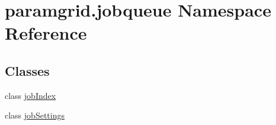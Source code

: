 \hypertarget{namespaceparamgrid_1_1jobqueue}{}\section{paramgrid.\+jobqueue Namespace Reference}
\label{namespaceparamgrid_1_1jobqueue}
\subsection*{Classes}
\begin{DoxyCompactItemize}
\item 
class \mbox{\hyperlink{classparamgrid_1_1jobqueue_1_1jobIndex}{job\+Index}}
\item 
class \mbox{\hyperlink{classparamgrid_1_1jobqueue_1_1jobSettings}{job\+Settings}}
\end{DoxyCompactItemize}
